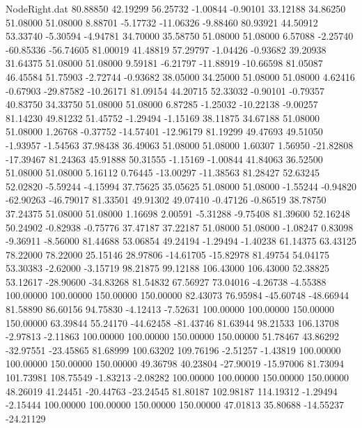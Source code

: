 \begin{filecontents}{NodeRight.dat}
  80.88850   42.19299   56.25732    -1.00844   -0.90101   33.12188   34.86250   51.08000   51.08000    8.88701   -5.17732  -11.06326   -9.88460
  80.93921   44.50912   53.33740    -5.30594   -4.94781   34.70000   35.58750   51.08000   51.08000    6.57088   -2.25740  -60.85336  -56.74605
  81.00019   41.48819   57.29797    -1.04426   -0.93682   39.20938   31.64375   51.08000   51.08000    9.59181   -6.21797  -11.88919  -10.66598
  81.05087   46.45584   51.75903    -2.72744   -0.93682   38.05000   34.25000   51.08000   51.08000    4.62416   -0.67903  -29.87582  -10.26171
  81.09154   44.20715   52.33032    -0.90101   -0.79357   40.83750   34.33750   51.08000   51.08000    6.87285   -1.25032  -10.22138   -9.00257
  81.14230   49.81232   51.45752    -1.29494   -1.15169   38.11875   34.67188   51.08000   51.08000    1.26768   -0.37752  -14.57401  -12.96179
  81.19299   49.47693   49.51050    -1.93957   -1.54563   37.98438   36.49063   51.08000   51.08000    1.60307    1.56950  -21.82808  -17.39467
  81.24363   45.91888   50.31555    -1.15169   -1.00844   41.84063   36.52500   51.08000   51.08000    5.16112    0.76445  -13.00297  -11.38563
  81.28427   52.63245   52.02820    -5.59244   -4.15994   37.75625   35.05625   51.08000   51.08000   -1.55244   -0.94820  -62.90263  -46.79017
  81.33501   49.91302   49.07410    -0.47126   -0.86519   38.78750   37.24375   51.08000   51.08000    1.16698    2.00591   -5.31288   -9.75408
  81.39600   52.16248   50.24902    -0.82938   -0.75776   37.47187   37.22187   51.08000   51.08000   -1.08247    0.83098   -9.36911   -8.56000
  81.44688   53.06854   49.24194    -1.29494   -1.40238   61.14375   63.43125   78.22000   78.22000   25.15146   28.97806  -14.61705  -15.82978
  81.49754   54.04175   53.30383    -2.62000   -3.15719   98.21875   99.12188  106.43000  106.43000   52.38825   53.12617  -28.90600  -34.83268
  81.54832   67.56927   73.04016    -4.26738   -4.55388  100.00000  100.00000  150.00000  150.00000   82.43073   76.95984  -45.60748  -48.66944
  81.58890   86.60156   94.75830    -4.12413   -7.52631  100.00000  100.00000  150.00000  150.00000   63.39844   55.24170  -44.62458  -81.43746
  81.63944   98.21533  106.13708    -2.97813   -2.11863  100.00000  100.00000  150.00000  150.00000   51.78467   43.86292  -32.97551  -23.45865
  81.68999  100.63202  109.76196    -2.51257   -1.43819  100.00000  100.00000  150.00000  150.00000   49.36798   40.23804  -27.90019  -15.97006
  81.73094  101.73981  108.75549    -1.83213   -2.08282  100.00000  100.00000  150.00000  150.00000   48.26019   41.24451  -20.44763  -23.24545
  81.80187  102.98187  114.19312    -1.29494   -2.15444  100.00000  100.00000  150.00000  150.00000   47.01813   35.80688  -14.55237  -24.21129

\end{filecontents}

